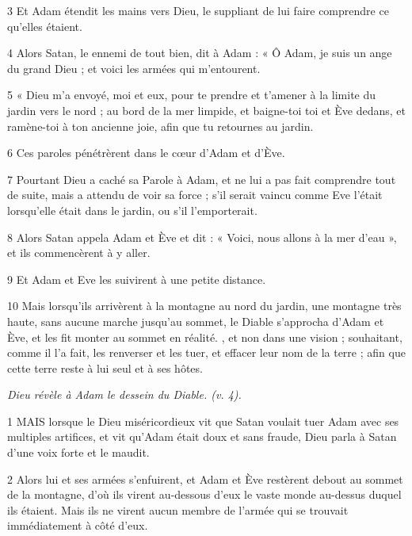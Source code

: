 \par 3 Et Adam étendit les mains vers Dieu, le suppliant de lui faire comprendre ce qu'elles étaient.

\par 4 Alors Satan, le ennemi de tout bien, dit à Adam : « Ô Adam, je suis un ange du grand Dieu ; et voici les armées qui m’entourent.

\par 5 « Dieu m'a envoyé, moi et eux, pour te prendre et t'amener à la limite du jardin vers le nord ; au bord de la mer limpide, et baigne-toi toi et Ève dedans, et ramène-toi à ton ancienne joie, afin que tu retournes au jardin.

\par 6 Ces paroles pénétrèrent dans le cœur d'Adam et d'Ève.

\par 7 Pourtant Dieu a caché sa Parole à Adam, et ne lui a pas fait comprendre tout de suite, mais a attendu de voir sa force ; s'il serait vaincu comme Eve l'était lorsqu'elle était dans le jardin, ou s'il l'emporterait.

\par 8 Alors Satan appela Adam et Ève et dit : « Voici, nous allons à la mer d'eau », et ils commencèrent à y aller.

\par 9 Et Adam et Eve les suivirent à une petite distance.

\par 10 Mais lorsqu'ils arrivèrent à la montagne au nord du jardin, une montagne très haute, sans aucune marche jusqu'au sommet, le Diable s'approcha d'Adam et Ève, et les fit monter au sommet en réalité. , et non dans une vision ; souhaitant, comme il l'a fait, les renverser et les tuer, et effacer leur nom de la terre ; afin que cette terre reste à lui seul et à ses hôtes.




\par \textit{Dieu révèle à Adam le dessein du Diable. (v. 4).}

\par 1 MAIS lorsque le Dieu miséricordieux vit que Satan voulait tuer Adam avec ses multiples artifices, et vit qu'Adam était doux et sans fraude, Dieu parla à Satan d'une voix forte et le maudit.

\par 2 Alors lui et ses armées s'enfuirent, et Adam et Ève restèrent debout au sommet de la montagne, d'où ils virent au-dessous d'eux le vaste monde au-dessus duquel ils étaient. Mais ils ne virent aucun membre de l'armée qui se trouvait immédiatement à côté d'eux.

